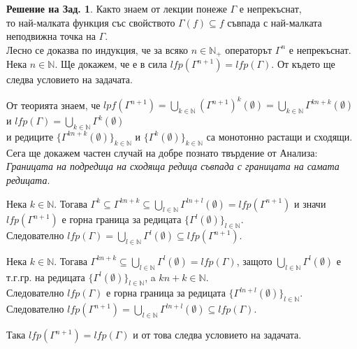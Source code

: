 \documentclass[a4paper,9pt]{extarticle}
\theoremstyle{definition}
\newtheorem{solution}{Решение на Зад.}
\newcommand{\Nat}{\mathbb{N}}
\begin{document}
\begin{solution}
Както знаем от лекции понеже $\Gamma$ е непрекъснат, \\
то най-малката функция със свойството $\Gamma(f)\subseteq f$ 
съвпада с най-малката неподвижна точка на $\Gamma$. \\
Лесно се доказва по индукция, че за всяко $n \in \Nat_+$ операторът $\Gamma^n$ е непрекъснат. \\
Нека \(n \in \Nat\).
Ще докажем, че е в сила $lfp(\Gamma^{n + 1}) = lfp(\Gamma)$. От където ще следва условието на задачата.

\vskip9pt

От теорията знаем, че $lpf(\Gamma^{n + 1}) = \displaystyle\bigcup_{k \in \Nat} (\Gamma^{n + 1})^k(\emptyset) = \displaystyle\bigcup_{k \in \Nat} \Gamma^{kn + k}(\emptyset)$ и $lfp(\Gamma) = \displaystyle\bigcup_{k \in \Nat} \Gamma^k(\emptyset)$ \\
и редиците $\{\Gamma^{kn + k}(\emptyset)\}_{k \in \Nat}$ и $\{\Gamma^{k}(\emptyset)\}_{k \in \Nat}$ са монотонно растащи и сходящи. \\

Сега ще докажем частен случай на добре познато твърдение от Анализа: \\
\textit{Границата на подредица на сходяща редица съвпада с границата на самата редицата}.

\vskip9pt

Нека $k \in \Nat$. Тогава $\Gamma^k \subseteq \Gamma^{kn + k} \subseteq \displaystyle\bigcup_{l \in \Nat} \Gamma^{ln + l}(\emptyset) = lfp(\Gamma^{n + 1})$ и значи $lfp(\Gamma^{n + 1})$ е горна граница за редицата $\{\Gamma^{l}(\emptyset)\}_{l \in \Nat}$. \\
Следователно $lfp(\Gamma) = \displaystyle\bigcup_{l \in \Nat} \Gamma^{l}(\emptyset) \subseteq lfp(\Gamma^{n + 1})$.

\vskip9pt

Нека $k \in \Nat$. Тогава $\Gamma^{kn + k} \subseteq \displaystyle\bigcup_{l \in \Nat} \Gamma^l(\emptyset) = lfp(\Gamma)$,
защото $\displaystyle\bigcup_{l \in \Nat} \Gamma^l(\emptyset)$ е т.г.гр. на редицата $\{\Gamma^{l}(\emptyset)\}_{l \in \Nat}$, a $kn + k \in \Nat$. \\ Следователно $lfp(\Gamma)$ е горна граница за редицата $\{\Gamma^{ln + l}(\emptyset)\}_{l \in \Nat}$.
Следователно $lfp(\Gamma^{n + 1}) = \displaystyle\bigcup_{l \in \Nat} \Gamma^{ln + l}(\emptyset) \subseteq lfp(\Gamma)$.

\vskip9pt

Така $lfp(\Gamma^{n + 1}) = lfp(\Gamma)$ и от това следва условието на задачата.


\end{solution}
\end{document}
